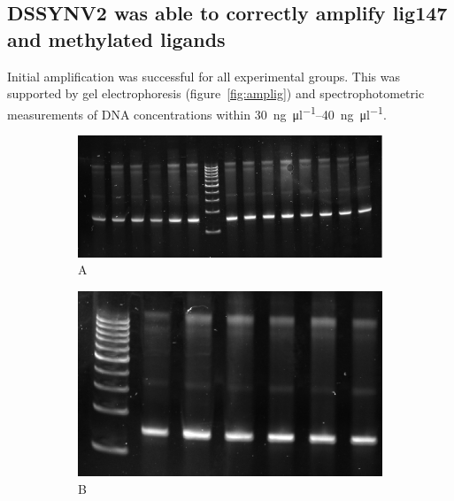 \documentclass[parskip=full, numbers=noenddot]{scrreprt}
\begin{document}
\subsection{DSSYNV2 was able to correctly amplify lig147 and methylated ligands}
\label{ssec:amplig}


Initial amplification was successful for all experimental groups. This was supported by gel electrophoresis (figure~\ref{fig:amplig}) and spectrophotometric measurements of DNA concentrations within \SIrange{30}{40}{\nano\gram\per\micro\litre}.

\begin{figure}[htpb]
  \centering
  \begin{subfigure}[htpb]{0.4\textwidth}
    \centering
    \includegraphics[width=\textwidth]{amplig_a}
    \caption{A}
    \label{fig:amplig_a}
  \end{subfigure}
  \begin{subfigure}[htpb]{0.4\textwidth}
    \centering
    \includegraphics[width=\textwidth]{amplig_b}
    \caption{B}
    \label{fig:amplig_b}
  \end{subfigure}
  \begin{subfigure}[htpb]{0.4\textwidth}

\end{subfigure}
\end{figure}
\end{document}
